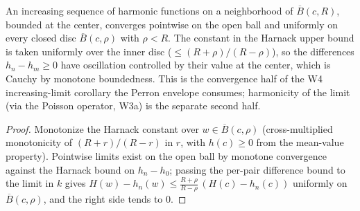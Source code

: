 \begin{lemma}
\label{lem:perron-harnack-uniform-limit}
An increasing sequence of harmonic functions on a neighborhood of
\(\overline{B}(c, R)\), bounded at the center, converges pointwise on
the open ball and uniformly on every closed disc
\(\overline{B}(c, \rho)\) with \(\rho < R\).  The constant in the
Harnack upper bound is taken uniformly over the inner disc
(\(\le (R+\rho)/(R-\rho)\)), so the differences \(h_n - h_m \ge 0\)
have oscillation controlled by their value at the center, which is
Cauchy by monotone boundedness.  This is the convergence half of the
W4 increasing-limit corollary the Perron envelope consumes;
harmonicity of the limit (via the Poisson operator, W3a) is the
separate second half.
\leanok
\end{lemma}
\begin{proof}\leanok
Monotonize the Harnack constant over \(w \in \overline{B}(c, \rho)\)
(cross-multiplied monotonicity of \((R+r)/(R-r)\) in \(r\), with
\(h(c) \ge 0\) from the mean-value property).  Pointwise limits exist
on the open ball by monotone convergence against the Harnack bound on
\(h_n - h_0\); passing the per-pair difference bound to the limit in
\(k\) gives \(H(w) - h_n(w) \le \frac{R+\rho}{R-\rho}\,(H(c) - h_n(c))\)
uniformly on \(\overline{B}(c, \rho)\), and the right side tends to
\(0\).
\end{proof}

